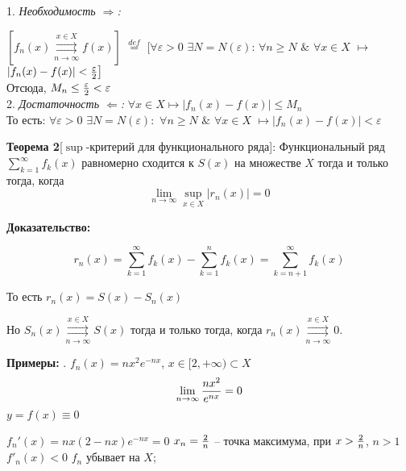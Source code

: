 \documentclass[a4paper,12pt]{article} %
\begin{document}
 1. \textit{Необходимость $\Rightarrow$:} \newline
 
 $[f_n(x) \overset{x \in X}{\underset{n \rightarrow \infty}{\rightrightarrows}} f(x)]$ $\stackrel{def}{=}$ $\big[\forall \varepsilon > 0 $  $\exists N = N(\varepsilon)$: $\forall n \geq N$  $\&$  $\forall x \in X$ $\longmapsto$ $|f_n(x) -f(x)| < {\varepsilon \over 2} \big]$
 \\[5 mm]
 Отсюда, $M_n \leq {\varepsilon \over 2 } < \varepsilon$
\\[ 5 mm]
2. \textit{Достаточность $\Leftarrow$:} \newline
\hspace*{5mm}$\forall x \in X \longmapsto |f_n(x)-f(x)|\leq M_n$ 
\\[ 5 mm]
То есть: \newline
\hspace*{20mm}$\forall \varepsilon > 0$  $\exists N = N(\varepsilon):$  $\forall n \geq N$ $\&$ $\forall x \in X$ $\longmapsto |f_n(x)-f(x)| < \varepsilon$ \newline


\noindent \textbf{Теорема 2}[$\sup$-критерий для функционального ряда]:\newline 
Функциональный ряд $\sum\limits_{k = 1}^{\infty}  f_k(x)$ равномерно сходится к $S(x)$ на множестве $X$ тогда и только тогда, когда $$\lim_{n \rightarrow \infty} \sup_{x \in X} |r_n(x)| = 0$$

\noindent \textbf{Доказательство:} 

$$r_n(x) = \sum_{k = 1}^{\infty}  f_k(x) -  \sum_{k = 1}^{n}  f_k(x)= \sum_{k = n+1}^{\infty}  f_k(x)$$ \newline

То есть $r_n(x)=S(x)-S_n(x)$ \newline

Но $S_n(x) \overset{x \in X}{\underset{n \rightarrow \infty}{\rightrightarrows}} S(x)$ тогда и только тогда, когда $r_n(x) \overset{x \in X}{\underset{n \rightarrow \infty}{\rightrightarrows}} 0$.

\noindent \textbf{Примеры:} . $f_n(x) = nx^2e^{-nx}$, $x \in [2, +\infty) \subset X$ \newline
$$\lim_{n \rightarrow \infty}{nx^2 \over e^{nx}} = 0$$ \Rightarrow $y=f(x)\equiv0$ \newline

$f_n'(x) = nx(2-nx)e^{-nx} = 0$ \newline
\hspace*{5mm}$x_n = { 2\over n}$ -- точка максимума, при $x > {2 \over n}$, $n>1$ \overmapsto $f'_n(x) < 0$ \Rightarrow $f_n$ убывает на $X$;
\newline 
\end{document}
